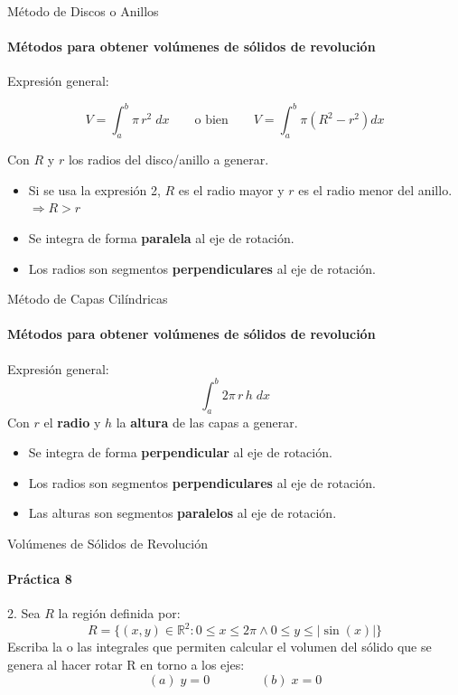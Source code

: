 \documentclass{plantillaPPT}
\begin{document}
\primeraDiapo

\begin{frame}{Método de Discos o Anillos}
    \framesubtitle{Métodos para obtener volúmenes de sólidos de revolución}

Expresión general:

\[V = \int_{a}^{b} \pi \, r^2\; dx \qquad\text{o bien}\qquad V=\int_{a}^{b}\pi (R^2-r^2)dx\]

Con \(R\) y \(r\) los radios del disco/anillo a generar.\\ \vspace{0.2cm}
\begin{itemize}
    \item Si se usa la expresión 2, \(R\) es el radio mayor y \(r\) es el radio menor del anillo. \(\Rightarrow R>r\)
    \item Se integra de forma \textbf{paralela} al eje de rotación.
    \item Los radios son segmentos \textbf{perpendiculares} al eje de rotación.

\end{itemize}

\end{frame}

\begin{frame}{Método de Capas Cilíndricas}
    \framesubtitle{Métodos para obtener volúmenes de sólidos de revolución}

Expresión general:
\[\int_{a}^{b} 2\pi \,r\, h \; dx\]
Con \textbf{\(r\)} el \textbf{radio} y \textbf{\(h\)} la \textbf{altura} de las capas a generar. \\ \vspace{0.2cm}
\begin{itemize}
    \item Se integra de forma \textbf{perpendicular} al eje de rotación.
    \item Los radios son segmentos \textbf{perpendiculares} al eje de rotación. 
    \item Las alturas son segmentos \textbf{paralelos} al eje de rotación.
\end{itemize}
\end{frame}

\begin{frame}{Volúmenes de Sólidos de Revolución}
    \framesubtitle{Práctica 8}

2. Sea \(R\) la región definida por:
\[R = \{(x,y)\in \mathbb{R}^2:0\leq x\leq 2\pi \land 0 \leq y \leq |\sin(x)|\}\]
Escriba la o las integrales que permiten calcular el volumen del sólido que se genera al hacer rotar R en torno a los ejes:
\[(a) \; y = 0 \qquad \qquad (b)\;x=0 \]
    
\end{frame}
\end{document}
